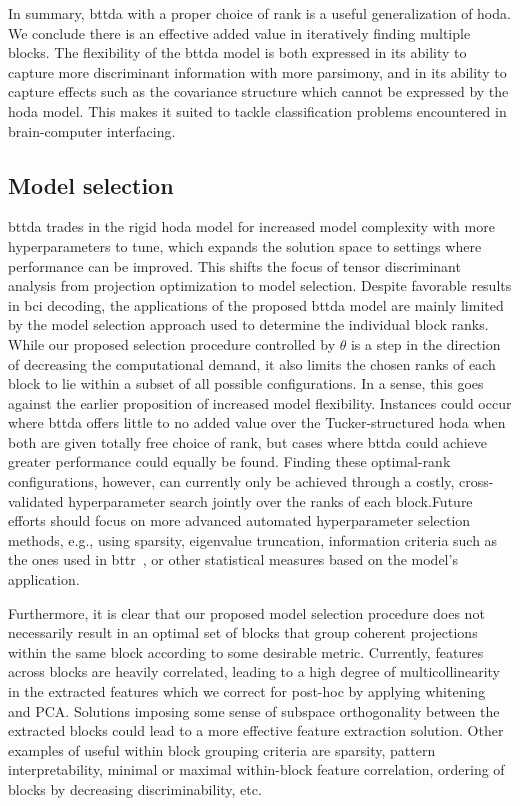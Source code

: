 \documentclass[twocolumn]{article}
\begin{document}
	In summary, \ac{bttda} with a proper choice of rank is a useful generalization
	of \ac{hoda}.
	We conclude there is an effective	added value in iteratively finding multiple blocks.
	The flexibility of the \ac{bttda} model is both expressed in its ability
	to capture more discriminant information with more parsimony,
	and in its ability to capture effects such as the covariance structure which
	cannot be expressed by the \ac{hoda} model.
	This makes it suited to tackle classification problems encountered in brain-computer interfacing.

	\subsection{Model selection}

	\Ac{bttda} trades in the rigid \ac{hoda} model for increased model complexity with more
	hyperparameters to tune, which expands the solution space to settings where performance can be
	improved.
	This shifts the focus of tensor discriminant analysis from projection
	optimization to model selection.
	Despite favorable results in \ac{bci} decoding, the applications of the proposed
	\ac{bttda} model are mainly limited by the model selection approach used
	to determine the individual block ranks.
	While our proposed selection procedure controlled by $\theta$
	is a step in the direction of decreasing the computational demand, it
	also limits the chosen ranks of each block to lie within a subset of all possible configurations.
	In a sense, this goes against the earlier proposition of increased model flexibility.
	Instances could occur where \ac{bttda} offers little to no added value over the
	Tucker-structured \ac{hoda} when both are given totally free choice of rank, but cases where \ac{bttda} could achieve greater performance could equally be found.
	Finding these optimal-rank configurations, however, can currently only be achieved
	through a costly, cross-validated hyperparameter search jointly over the ranks of each block.Future efforts should focus on more advanced automated hyperparameter selection methods, e.g., using sparsity,
	eigenvalue truncation, information criteria such as the ones used in
	\ac{bttr}~\cite{Faes2022}, or other statistical measures based on the model's
	application.

	Furthermore, it is clear that our proposed model selection procedure does not
	necessarily result in an optimal set of blocks that group coherent projections
	within the same block according to some desirable metric.
	Currently, features across blocks are heavily correlated, leading to a high
	degree of multicollinearity in the extracted features which we correct for post-hoc
	by applying whitening and PCA.
	Solutions imposing some sense of subspace orthogonality between the extracted blocks
	could lead to a more effective feature extraction solution.
	Other examples of useful within block grouping criteria are sparsity,
	pattern interpretability, minimal or maximal within-block feature correlation,
	ordering of blocks by decreasing discriminability, etc.
\end{document}
